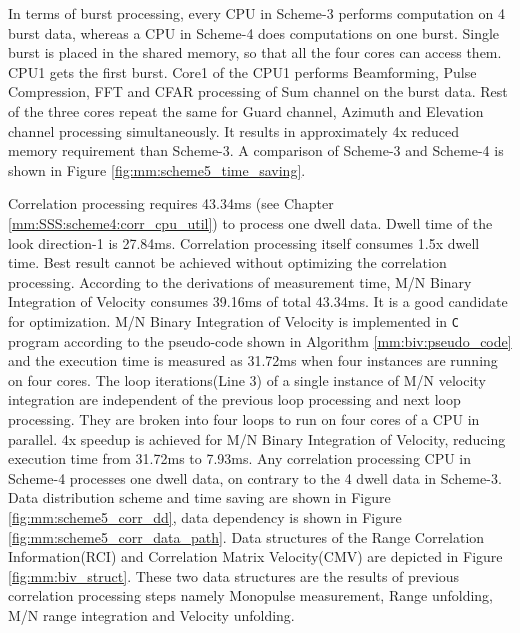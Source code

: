 In terms of burst processing, every CPU in Scheme-3 performs computation on 4 burst data, whereas a CPU in Scheme-4 does computations on one burst. Single burst is placed in the shared memory, so that all the four cores can access them. CPU1 gets the first burst. Core1 of the CPU1 performs Beamforming, Pulse Compression, FFT and CFAR processing of Sum channel on the burst data. Rest of the three cores repeat the same for Guard channel, Azimuth and Elevation channel processing simultaneously. It results in approximately 4x reduced memory requirement than Scheme-3. A comparison of Scheme-3 and Scheme-4 is shown in Figure \ref{fig:mm:scheme5_time_saving}.

Correlation processing requires 43.34ms (see Chapter \ref{mm:SSS:scheme4:corr_cpu_util}) to process one dwell data. Dwell time of the look direction-1 is 27.84ms. Correlation processing itself consumes 1.5x dwell time. Best result cannot be achieved without optimizing the correlation processing. According to the derivations of measurement time, M/N Binary Integration of Velocity consumes 39.16ms of total 43.34ms. It is a good candidate for optimization. M/N Binary Integration of Velocity is implemented in \verb|C| program according to the pseudo-code shown in Algorithm \ref{mm:biv:pseudo_code} and the execution time is measured as 31.72ms when four instances are running on four cores. The loop iterations(Line 3) of a single instance of M/N velocity integration are independent of the previous loop processing and next loop processing. They are broken into four loops to run on four cores of a CPU in parallel. 4x speedup is achieved for M/N Binary Integration of Velocity, reducing execution time from 31.72ms to 7.93ms. Any correlation processing CPU in Scheme-4 processes one dwell data, on contrary to the 4 dwell data in Scheme-3. Data distribution scheme and time saving are shown in Figure \ref{fig:mm:scheme5_corr_dd}, data dependency is shown in Figure \ref{fig:mm:scheme5_corr_data_path}. Data structures of the Range Correlation Information(RCI) and Correlation Matrix Velocity(CMV) are depicted in Figure \ref{fig:mm:biv_struct}. These two data structures are the results of previous correlation processing steps namely Monopulse measurement, Range unfolding, M/N range integration and Velocity unfolding.

\renewcommand{\algorithmicrequire}{\textbf{Input:}}
\renewcommand{\algorithmicensure}{\textbf{Output:}}

